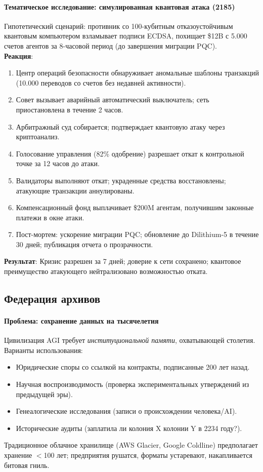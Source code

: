 \documentclass[11pt]{article}
\begin{document}
\paragraph{Тематическое исследование: симулированная квантовая атака (2185)}
Гипотетический сценарий: противник со 100-кубитным отказоустойчивым квантовым компьютером взламывает подписи ECDSA, похищает \$12B с 5.000 счетов агентов за 8-часовой период (до завершения миграции PQC).\\
\textbf{Реакция}:
\begin{enumerate}[noitemsep]
  \item Центр операций безопасности обнаруживает аномальные шаблоны транзакций (10.000 переводов со счетов без недавней активности).
  \item Совет вызывает аварийный автоматический выключатель; сеть приостановлена в течение 2 часов.
  \item Арбитражный суд собирается; подтверждает квантовую атаку через криптоанализ.
  \item Голосование управления (82\% одобрение) разрешает откат к контрольной точке за 12 часов до атаки.
  \item Валидаторы выполняют откат; украденные средства восстановлены; атакующие транзакции аннулированы.
  \item Компенсационный фонд выплачивает \$200M агентам, получившим законные платежи в окне атаки.
  \item Пост-мортем: ускорение миграции PQC; обновление до Dilithium-5 в течение 30 дней; публикация отчета о прозрачности.
\end{enumerate}
\textbf{Результат}: Кризис разрешен за 7 дней; доверие к сети сохранено; квантовое преимущество атакующего нейтрализовано возможностью отката.

\subsection{Федерация архивов}

\paragraph{Проблема: сохранение данных на тысячелетия}
Цивилизация AGI требует \emph{институциональной памяти}, охватывающей столетия. Варианты использования:
\begin{itemize}[noitemsep]
  \item Юридические споры со ссылкой на контракты, подписанные 200 лет назад.
  \item Научная воспроизводимость (проверка экспериментальных утверждений из предыдущей эры).
  \item Генеалогические исследования (записи о происхождении человека/AI).
  \item Исторические аудиты (заплатила ли колония X колонии Y в 2234 году?).
\end{itemize}
Традиционное облачное хранилище (AWS Glacier, Google Coldline) предполагает хранение $<$100 лет; предприятия рушатся, форматы устаревают, накапливается битовая гниль.
\end{document}

